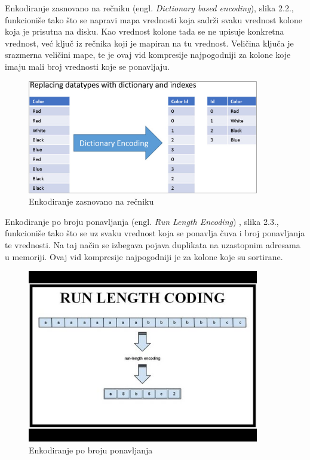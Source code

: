 \documentclass[12pt,oneside]{memoir}
\begin{document}
Enkodiranje zasnovano na rečniku (engl. \textit{Dictionary based encoding}), slika 2.2., funkcioniše tako što se napravi mapa vrednosti koja sadrži svaku vrednost kolone koja je prisutna na disku. Kao vrednost kolone tada se ne upisuje konkretna vrednost, već ključ iz rečnika koji je mapiran na tu vrednost. Veličina ključa je srazmerna veličini mape, te je ovaj vid kompresije najpogodniji za kolone koje imaju mali broj vrednosti koje se ponavljaju.

\begin{figure}[!ht]
  \centering
  \includegraphics[width=0.9\textwidth]{DictionaryEncoding.jpg}
  \caption{Enkodiranje zasnovano na rečniku}
  \label{fig:grafikon}
\end{figure}


Enkodiranje po broju ponavljanja  (engl. \textit{Run Length Encoding}) , slika 2.3., funkcioniše tako što se uz svaku vrednost koja se ponavlja čuva i broj ponavljanja te vrednosti. Na taj način se izbegava pojava duplikata na uzastopnim adresama u memoriji. Ovaj vid kompresije najpogodniji je za kolone koje su sortirane.
\pagebreak



\begin{figure}[!ht]
  \centering
  \includegraphics[width=0.9\textwidth]{run-length-encoding.jpg}
  \caption{Enkodiranje po broju ponavljanja}
  \label{fig:grafikon}
\end{figure}
\end{document}
